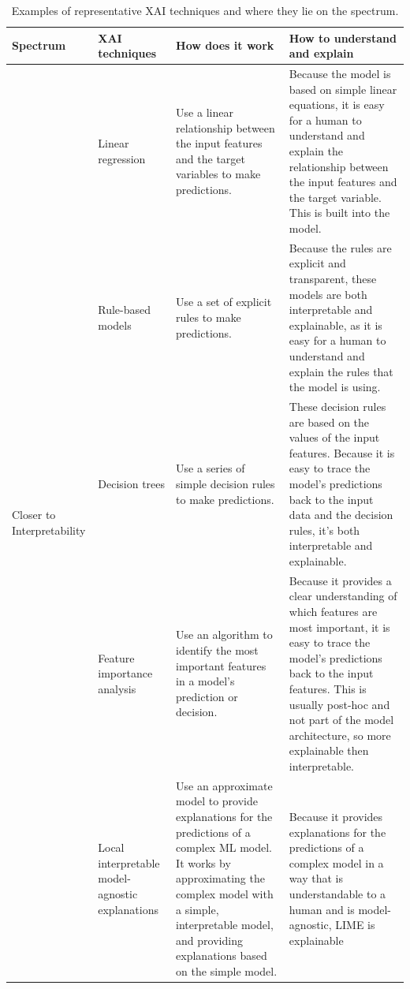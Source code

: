 \documentclass[final,5p,times,twocolumn]{elsarticle}
\begin{document}
\begin{table}[h]
  \begin{center}
    \caption{Examples of representative XAI techniques and where they lie on the spectrum.}        \label{tabExampleXAItechniques}
    \begin{tabular}{m{60pt}|m{70pt}|m{140pt}|m{175pt}} \hline
        \textbf{Spectrum} & \textbf{XAI techniques}&\textbf{How does it work}&\textbf{How to understand and explain} \\ \hline
		
        \multirow{7}{50pt}{Closer to Interpretability}&Linear regression&Use a linear relationship between the input features and the target variables to make	predictions.& Because the model is based on simple linear equations, it is easy for a human to understand and explain the relationship between the input features and the target variable. This is built into the model. \\ \cline{2-4}
		
		
        &Rule-based models& Use a set of explicit rules to make predictions.& Because the rules are explicit and transparent, these models are both interpretable and explainable, as it is easy for a human to understand and explain the rules that the model is using. \\ \hline		
        In the middle & Decision trees&Use a series of simple decision rules to make predictions. &These decision rules are based on the values of the input features. Because it is easy to trace	the model's predictions back to the input data and the decision rules, it's both interpretable and explainable.  \\ \hline
        
        \multirow{7}{50pt}{Closer to Explainability}&Feature importance analysis& Use an algorithm to identify the most important features in a model's prediction or	decision.& Because it provides a clear understanding of which features are most important, it is easy to trace	the model’s predictions back to the input features. This is usually post-hoc and not part of the model architecture, so more explainable then interpretable.  \\ \cline{2-4}
		
        &Local interpretable model-agnostic explanations& Use an approximate model to provide explanations for the predictions of a complex ML model. It works by approximating the complex model with a simple, interpretable model, and providing explanations based on the	simple model. &Because it provides explanations for the predictions of a complex model in a way that is	understandable to a human and is model-agnostic, LIME is explainable \\ \hline
		
		
	\end{tabular}
\end{center}  
\end{table}
\end{document}
